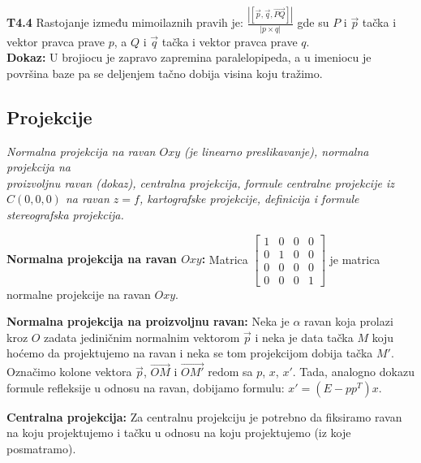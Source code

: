 \documentclass[12pt]{article}
\newcommand{\vek}[1]{\overrightarrow{#1}}
\begin{document}
\textbf{T4.4} Rastojanje između mimoilaznih pravih je:
$\frac{|[\vek{p},\vek{q},\vek{PQ}]|}{|p\times q|}$ gde su $P$ i $\vek{p}$ tačka
i vektor pravca prave $p$, a $Q$ i $\vek{q}$ tačka i vektor pravca prave $q$.\\
\textbf{Dokaz:} U brojiocu je zapravo zapremina paralelopipeda, a u imeniocu je
površina baze pa se deljenjem tačno dobija visina koju tražimo.
\par

\subsection{Projekcije}
\textit{Normalna projekcija na ravan $Oxy$ (je linearno preslikavanje),
    normalna projekcija na\\proizvoljnu ravan (dokaz), centralna projekcija, formule
    centralne projekcije iz $C(0,0,0)$ na ravan $z=f$, kartografske projekcije,
    definicija i formule stereografska projekcija.}
\par
\vspace*{1cm}

\textbf{Normalna projekcija na ravan $Oxy$:} Matrica $\begin{bmatrix}
        1 & 0 & 0 & 0 \\
        0 & 1 & 0 & 0 \\
        0 & 0 & 0 & 0 \\
        0 & 0 & 0 & 1
    \end{bmatrix}$ je matrica normalne projekcije na ravan $Oxy$.
\par

\textbf{Normalna projekcija na proizvoljnu ravan:} Neka je $\alpha$ ravan koja
prolazi kroz $O$ zadata jediničnim normalnim vektorom $\vek{p}$ i neka je data
tačka $M$ koju hoćemo da projektujemo na ravan i neka se tom projekcijom dobija
tačka $M'$. Označimo kolone vektora $\vek{p}$, $\vek{OM}$ i $\vek{OM'}$ redom
sa $p$, $x$, $x'$. Tada, analogno dokazu formule refleksije u odnosu na ravan,
dobijamo formulu: $x'=(E-pp^T)x$.
\par

\textbf{Centralna projekcija:} Za centralnu projekciju je potrebno da fiksiramo
ravan na koju projektujemo i tačku u odnosu na koju projektujemo (iz koje
posmatramo).
\par
\end{document}
